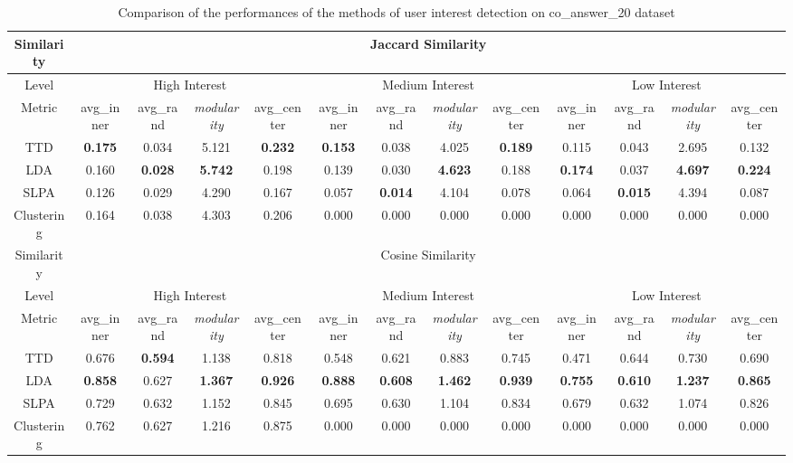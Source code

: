 \begin{sidewaystable}

\caption{Comparison of the performances of the methods of user interest detection  on co\_answer\_20 dataset}
\label{tab:uidcompare20}
\scriptsize
\centering
\begin{tabular}{|c|c|c|c|c|c|c|c|c|c|c|c|c|}

\hline
Similarity & \multicolumn{12}{c|}{Jaccard Similarity}  \\
\hline
Level  &  \multicolumn{4}{c|}{High Interest} & \multicolumn{4}{c|}{Medium Interest} &  \multicolumn{4}{c|}{Low Interest} \\
\hline
Metric  & avg\_inner & avg\_rand & \textit{modularity} & avg\_center& avg\_inner & avg\_rand & \textit{modularity} & avg\_center& avg\_inner & avg\_rand & \textit{modularity} & avg\_center \\
\hline
TTD&\textbf{0.175}&0.034&5.121&\textbf{0.232}&\textbf{0.153}&0.038&4.025&\textbf{0.189}&0.115&0.043&2.695&0.132\\
\hline
LDA&0.160&\textbf{0.028}&\textbf{5.742}&0.198&0.139&0.030&\textbf{4.623}&0.188&\textbf{0.174}&0.037&\textbf{4.697}&\textbf{0.224}\\
\hline
SLPA&0.126&0.029&4.290&0.167&0.057&\textbf{0.014}&4.104&0.078&0.064&\textbf{0.015}&4.394&0.087\\
\hline
Clustering&0.164&0.038&4.303&0.206&0.000&0.000&0.000&0.000&0.000&0.000&0.000&0.000\\
\hline
Similarity & \multicolumn{12}{c|}{Cosine Similarity}  \\
\hline
Level  &  \multicolumn{4}{c|}{High Interest} & \multicolumn{4}{c|}{Medium Interest} &  \multicolumn{4}{c|}{Low Interest} \\
\hline
Metric  & avg\_inner & avg\_rand & \textit{modularity} & avg\_center& avg\_inner & avg\_rand & \textit{modularity} & avg\_center& avg\_inner & avg\_rand & \textit{modularity} & avg\_center \\ 
\hline
TTD&0.676&\textbf{0.594}&1.138&0.818&0.548&0.621&0.883&0.745&0.471&0.644&0.730&0.690\\ \hline
LDA&\textbf{0.858}&0.627&\textbf{1.367}&\textbf{0.926}&\textbf{0.888}&\textbf{0.608}&\textbf{1.462}&\textbf{0.939}&\textbf{0.755}&\textbf{0.610}&\textbf{1.237}&\textbf{0.865}\\ \hline
SLPA&0.729&0.632&1.152&0.845&0.695&0.630&1.104&0.834&0.679&0.632&1.074&0.826\\ \hline
Clustering&0.762&0.627&1.216&0.875&0.000&0.000&0.000&0.000&0.000&0.000&0.000&0.000\\ \hline
\end{tabular}

\end{sidewaystable}






